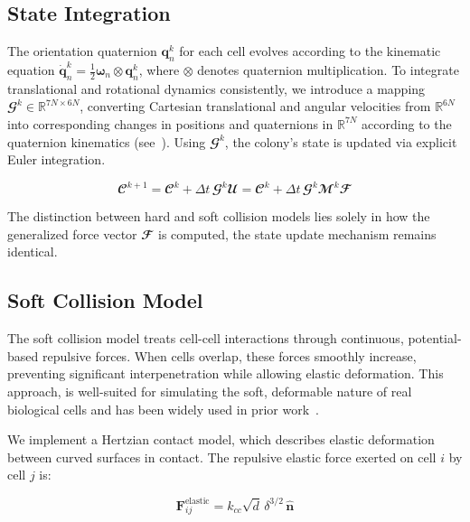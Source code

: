 \documentclass[conference]{IEEEtran}
\begin{document}
\subsection{State Integration}

The orientation quaternion $\mathbf{q}_n^k$ for each cell evolves according to the kinematic equation $\dot{\mathbf{q}}_n^k = \frac{1}{2} \boldsymbol{\omega}_n \otimes \mathbf{q}_n^k$, where $\otimes$ denotes quaternion multiplication. To integrate translational and rotational dynamics consistently, we introduce a mapping $\mathbfcal{G}^k \in \mathbb{R}^{7N \times 6N}$, converting Cartesian translational and angular velocities from $\mathbb{R}^{6N}$ into corresponding changes in positions and quaternions in $\mathbb{R}^{7N}$ according to the quaternion kinematics (see~\cite{Weady2024SM,Yan2022,Tasora2008}). Using $\mathbfcal{G}^k$, the colony's state is updated via explicit Euler integration.

\begin{equation} \label{eq:colony_update}
    \mathbfcal{C}^{k+1} = \mathbfcal{C}^k + \Delta t \, \mathbfcal{G}^k \mathbfcal{U} = \mathbfcal{C}^k + \Delta t \, \mathbfcal{G}^k \mathbfcal{M}^k \mathbfcal{F}
\end{equation}

The distinction between hard and soft collision models lies solely in how the generalized force vector $\mathbfcal{F}$ is computed, the state update mechanism remains identical.

\subsection{Soft Collision Model}

The soft collision model treats cell-cell interactions through continuous, potential-based repulsive forces. When cells overlap, these forces smoothly increase, preventing significant interpenetration while allowing elastic deformation. This approach, is well-suited for simulating the soft, deformable nature of real biological cells and has been widely used in prior work~\cite{Warren2019, You2018,Blanchard2015,Ghosh2015,Khan_2024,You_2021,Valdez2025,Rudge2013,Langeslay_2023}.

We implement a Hertzian contact model, which describes elastic deformation between curved surfaces in contact. The repulsive elastic force exerted on cell $i$ by cell $j$ is:

\begin{equation} \label{eq:hertzian_contact_model}
    \mathbf{F}^{\text{elastic}}_{ij} = k_{cc} \sqrt{d} \, \delta^{3/2} \, \hat{\mathbf{n}}
\end{equation}
\end{document}
